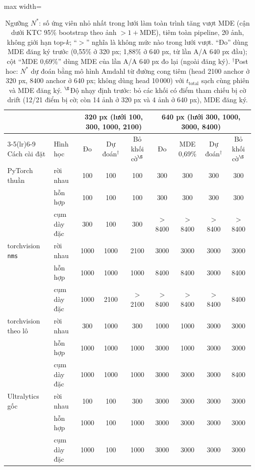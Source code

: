 \documentclass[a4paper,fleqn]{cas-dc}
\begin{document}
\begin{table}[!tp]
\centering\small
\caption{Ngưỡng $N^{*}$: số ứng viên nhỏ nhất trong lưới làm toàn trình tăng vượt MDE (cận dưới KTC 95\% bootstrap theo ảnh $>1+\mathrm{MDE}$), tiêm toàn pipeline, 20 ảnh, không giới hạn top-$k$; ``$>$'' nghĩa là không mức nào trong lưới vượt. ``Đo'' dùng MDE đăng ký trước (0,55\% ở 320 px; 1,88\% ở 640 px, từ lần A/A 640 px đầu); cột ``MDE 0,69\%'' dùng MDE của lần A/A 640 px đo lại (ngoài đăng ký). $^{\dagger}$Post hoc: $N^{*}$ dự đoán bằng mô hình Amdahl từ đường cong tiêm (head 2100 anchor ở 320 px, 8400 anchor ở 640 px; không dùng head 10\,000) với $t_{\mathrm{total}}$ sạch cùng phiên và MDE đăng ký. $^{\S}$Độ nhạy định trước: bỏ các khối có điểm tham chiếu bị cờ drift (12/21 điểm bị cờ; còn 14 ảnh ở 320 px và 4 ảnh ở 640 px), MDE đăng ký.}
\label{tab:nstar}
\begin{adjustbox}{max width=\textwidth}
\begin{tabular}{@{}llccccccc@{}}
\toprule
 & & \multicolumn{3}{c}{320 px (lưới 100, 300, 1000, 2100)} & \multicolumn{4}{c}{640 px (lưới 300, 1000, 3000, 8400)} \\
\cmidrule(lr){3-5}\cmidrule(lr){6-9}
Cách cài đặt & Hình học & Đo & Dự đoán$^{\dagger}$ & Bỏ khối cờ$^{\S}$ & Đo & MDE 0,69\% & Dự đoán$^{\dagger}$ & Bỏ khối cờ$^{\S}$ \\
\midrule
PyTorch thuần & rời nhau & 100 & 100 & 100 & 300 & 300 & 300 & 300 \\
 & hỗn hợp & 100 & 100 & 100 & 300 & 300 & 300 & 300 \\
 & cụm dày đặc & 300 & 100 & 300 & $>$8400 & $>$8400 & $>$8400 & $>$8400 \\
torchvision \texttt{nms} & rời nhau & 1000 & 1000 & 2100 & 3000 & 3000 & 3000 & 3000 \\
 & hỗn hợp & 1000 & 1000 & 1000 & 8400 & 8400 & 3000 & 8400 \\
 & cụm dày đặc & 1000 & 2100 & $>$2100 & $>$8400 & $>$8400 & $>$8400 & 8400 \\
torchvision theo lô & rời nhau & 300 & 1000 & 300 & 1000 & 1000 & 3000 & 3000 \\
 & hỗn hợp & 1000 & 1000 & 1000 & 3000 & 1000 & 3000 & 3000 \\
 & cụm dày đặc & 1000 & 1000 & 1000 & 3000 & 3000 & 3000 & 8400 \\
Ultralytics gốc & rời nhau & 100 & 100 & 300 & 3000 & 3000 & 3000 & 3000 \\
 & hỗn hợp & 1000 & 100 & 1000 & 3000 & 3000 & 3000 & 3000 \\
 & cụm dày đặc & 1000 & 100 & 1000 & 3000 & 3000 & 3000 & 3000 \\
\bottomrule
\end{tabular}
\end{adjustbox}
\end{table}
\end{document}

